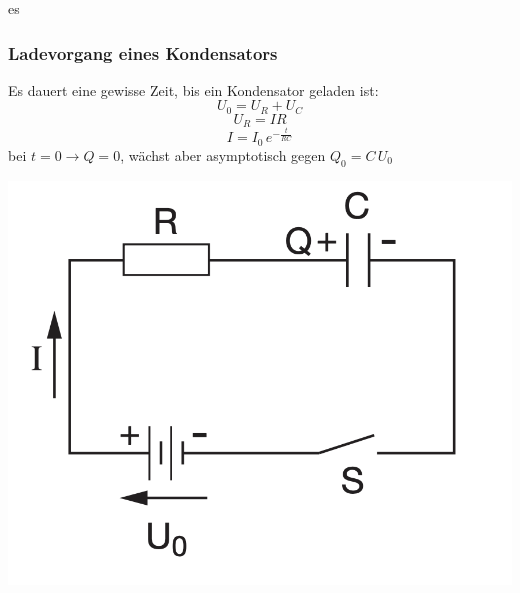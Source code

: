 es\documentclass[a4paper, fontsize=8pt, landscape]{scrartcl}
\begin{document}
\begin{multicols*}{4}
    \subsubsection{Ladevorgang eines Kondensators}
        Es dauert eine gewisse Zeit, bis ein Kondensator geladen ist:
        \[U_0 = U_R + U_C\]
        \[U_R = I R\]
        \[I = I_0\,e^{-\frac{t}{RC}}\]
        bei $t = 0 \rightarrow Q = 0$, wächst aber asymptotisch gegen $Q_0 = C\,U_0$
        \begin{center}
            \includegraphics[scale=0.1]{Images/Ladevorgang Kondensator.png}
        \end{center}
    

\end{multicols*}
\end{document}
